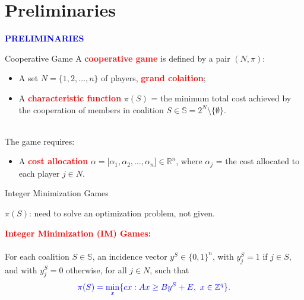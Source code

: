 \documentclass[14pt]{beamer}
\newcommand{\R}{\mathbb{R}}
\newcommand{\Z}{\mathbb{Z}}
\begin{document}
\section{Preliminaries}
\begin{frame}
\centering
\large
\textcolor{blue}{\bf {\huge P}RELIMINARIES}
\end{frame}
\begin{frame}{Cooperative Game}
A \textcolor{red}{\bf  cooperative game} is defined by a pair $(N,\pi)$:
\begin{itemize}
\justifying
	\item A set $N = \big\{1,2,\ldots,n\big\}$ of players, \textcolor{red}{\bf grand colaition};
	\item A \textcolor{red}{\bf characteristic function} $\pi(S)$ = the minimum total cost achieved by the cooperation of members in coalition $S \in \mathbb{S}=2^N \setminus \{\emptyset\}$.
\end{itemize}

~\\The game requires:
\begin{itemize}
\justifying
	\item A \textcolor{red}{\bf cost allocation} $\alpha=\big[\alpha_1,\alpha_2,\ldots,\alpha_n \big] \in \R^n$, where $\alpha_j$ = the cost allocated to each player $j \in N$.
\end{itemize}
\end{frame}


\begin{frame}{Integer Minimization Games}
\justifying
\small
\vspace{-2mm}
\begin{shaded}
\centering
$\pi(S)$: need to solve an optimization problem, not given.
\end{shaded}

\textcolor{red}{\bf Integer Minimization (IM) Games:}\\
~\\
For each coalition $S \in \mathbb{S}$, an incidence vector $y^S \in \{0,1\}^{n}$, with $y_j^S=1$ if $j \in S$, and with $y_j^S=0$ otherwise, for all $j \in N$, such that
\begin{equation*}
\color{blue}
\pi(S) = \min_{x} \{ cx: Ax \geq By^S + E, ~x \in \Z^{q} \}.
\end{equation*}
\end{frame}
\end{document}
